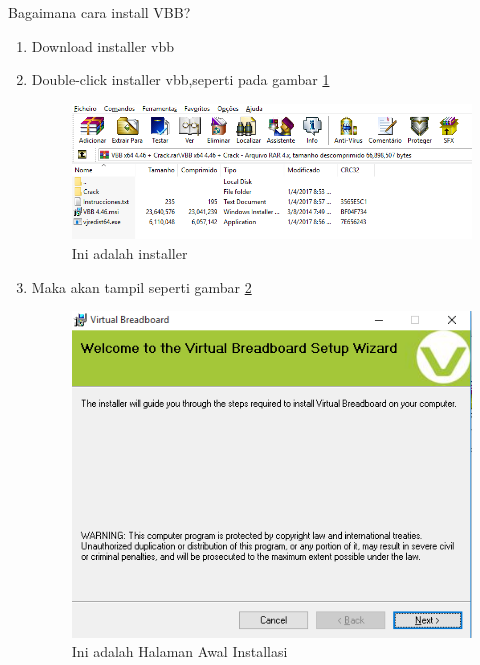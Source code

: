 Bagaimana cara install VBB?
\begin{enumerate}
\item Download installer vbb

\item Double-click installer vbb,seperti pada gambar \ref{fig:installer}
\begin{figure}[!htbp]
  \centering
  \includegraphics[width=.75\textwidth]{figures/VBB/installer.png}
  \caption{Ini adalah installer}\label{fig:installer}
\end{figure}

\item Maka akan tampil seperti gambar \ref{fig:halawalinstallasi}
\begin{figure}[!htbp]
  \centering
  \includegraphics[width=.75\textwidth]{figures/VBB/halawalinstallasi.png}
  \caption{Ini adalah Halaman Awal Installasi}\label{fig:halawalinstallasi}
\end{figure}


\end{enumerate}

